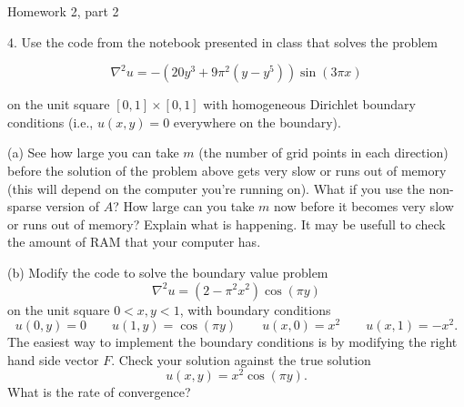 \documentclass[12pt,english]{article}
\begin{document}
\begin{center}
{\large Homework 2, part 2}
\par\end{center}{\large \par}

4. Use the code from the notebook presented in class that solves the problem

$$\nabla^2 u = -(20y^3+9\pi^2(y-y^5))\sin(3\pi x)$$  

on the unit square $[0,1]\times[0,1]$ with homogeneous Dirichlet boundary conditions (i.e., $u(x,y)=0$ everywhere on the boundary).

(a) See how large you can take $m$ (the number of grid points in each direction) before the solution of the problem above gets very slow or runs out of memory (this will depend on the computer you're running on). What if you use the non-sparse version of $A$? How large can you take $m$ now before it becomes very slow or runs out of memory? Explain what is happening.  It may be usefull to check the amount of RAM that your computer has.  

(b) Modify the code  to solve the boundary value problem
$$\nabla^2 u = (2-\pi^2 x^2)\cos(\pi y)$$
on the unit square $0<x,y<1$, with boundary conditions
$$u(0,y) = 0 \quad \quad u(1,y) = \cos(\pi y) \quad \quad u(x,0) = x^2 \quad \quad u(x,1)=-x^2.$$
The easiest way to implement the boundary conditions is by modifying the right hand side vector $F$.
Check your solution against the true solution $$u(x,y) = x^2 \cos(\pi y).$$  
What is the rate of convergence?  
\end{document}
